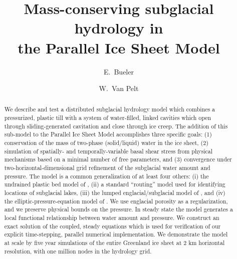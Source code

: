 \documentclass[gmd]{copernicus}   %
\begin{document}
\graphicspath{{figs/}}


\title{Mass-conserving subglacial hydrology in \\ the Parallel Ice Sheet Model}


\author[1]{E.~Bueler}
\author[2]{W.~Van Pelt}





\received{}
\pubdiscuss{} %
\revised{}
\accepted{}
\published{}


\maketitle

\begin{abstract}
We describe and test a distributed subglacial hydrology model which combines a pressurized, plastic till with a system of water-filled, linked cavities which open through sliding-generated cavitation  and close through ice creep.  The addition of this sub-model to the Parallel Ice Sheet Model accomplishes three specific goals: (1) conservation of the mass of two-phase (solid/liquid) water in the ice sheet, (2) simulation of spatially- and temporally-variable basal shear stress from physical mechanisms based on a minimal number of free parameters, and (3) convergence under two-horizontal-dimensional grid refinement of the subglacial water amount and pressure.  The model is a common generalization of at least four others: (i) the undrained plastic bed model of \cite{Tulaczyketal2000b}, (ii) a standard ``routing'' model used for identifying locations of subglacial lakes, (iii) the lumped englacial/subglacial model of \citep{Bartholomausetal2011}, and (iv) the elliptic-pressure-equation model of \cite{Schoofetal2012}.  We use englacial porosity as a regularization, and we preserve physical bounds on the pressure.  In steady state the model generates a local functional relationship between water amount and pressure.  We construct an exact solution of the coupled, steady equations which is used for verification of our explicit time-stepping, parallel numerical implementation.  We demonstrate the model at scale by five year simulations of the entire Greenland ice sheet at 2 km horizontal resolution, with one million nodes in the hydrology grid.
\end{abstract}
\end{document}
